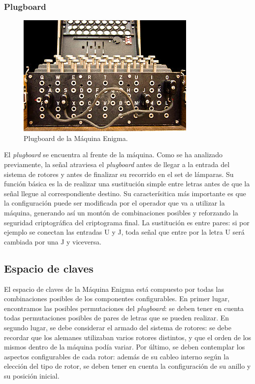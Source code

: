 \documentclass[a4paper,10pt]{article}
\begin{document}
\subsubsection{Plugboard}

\begin{figure}
    \includegraphics[width=1\linewidth]{plugboard.jpg} 
    \caption{Plugboard de la Máquina Enigma.\cite{wikimedia2}}
    \label{fig:wrapfig}
\end{figure}


El \textit{plugboard} se encuentra al frente de la máquina. Como se ha analizado previamente, la señal atraviesa el \textit{plugboard} antes de llegar a la entrada del sistema de rotores y antes de finalizar su recorrido en el set de lámparas. Su función básica es la de realizar una sustitución simple entre letras antes de que la señal llegue al correspondiente destino. Su caracterísitica más importante es que la configuración puede ser modificada por el operador que va a utilizar la máquina, generando así un montón de combinaciones posibles y reforzando la seguridad criptográfica del criptograma final. La sustitución es entre pares: si por ejemplo se conectan las entradas U y J, toda señal que entre por la letra U será cambiada por una J y viceversa.

\subsection{Espacio de claves}

El espacio de claves de la Máquina Enigma está compuesto por todas las combinaciones posibles de los componentes configurables. En primer lugar, encontramos las posibles permutaciones del \textit{plugboard}: se deben tener en cuenta todas permutaciones posibles de pares de letras que se pueden realizar. En segundo lugar, se debe considerar el armado del sistema de rotores: se debe recordar que los alemanes utilizaban varios rotores distintos, y que el orden de los mismos dentro de la máquina podía variar. Por último, se deben contemplar los aspectos configurables de cada rotor: además de su cableo interno según la elección del tipo de rotor, se deben tener en cuenta la configuración de su anillo y su posición inicial. 
\end{document}

